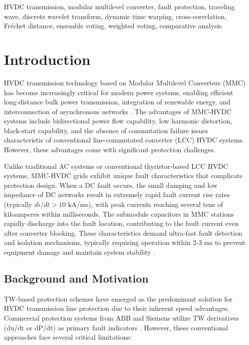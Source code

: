 \documentclass[journal]{IEEEtran}
\begin{document}
\begin{IEEEkeywords}
HVDC transmission, modular multilevel converter, fault protection, traveling wave, discrete wavelet transform, dynamic time warping, cross-correlation, Fr\'{e}chet distance, ensemble voting, weighted voting, comparative analysis.
\end{IEEEkeywords}

\section{Introduction}

 HVDC transmission technology based on Modular Multilevel Converters (MMC) has become increasingly critical for modern power systems, enabling efficient long-distance bulk power transmission, integration of renewable energy, and interconnection of asynchronous networks \cite{reference_paper_frechet, debnath2015, perez2015, flourentzou2009, vanhertem2016}. The advantages of MMC-HVDC systems include bidirectional power flow capability, low harmonic distortion, black-start capability, and the absence of commutation failure issues characteristic of conventional line-commutated converter (LCC) HVDC systems. However, these advantages come with significant protection challenges.

Unlike traditional AC systems or conventional thyristor-based LCC HVDC systems, MMC-HVDC grids exhibit unique fault characteristics that complicate protection design. When a DC fault occurs, the small damping and low impedance of DC networks result in extremely rapid fault current rise rates (typically $di/dt > 10$ kA/ms), with peak currents reaching several tens of kiloamperes within milliseconds. The submodule capacitors in MMC stations rapidly discharge into the fault location, contributing to the fault current even after converter blocking. These characteristics demand ultra-fast fault detection and isolation mechanisms, typically requiring operation within 2-3 ms to prevent equipment damage and maintain system stability \cite{reference1, reference2, sneath2016, yang2010, bucher2016}.



\subsection{Background and Motivation}

TW-based protection schemes have emerged as the predominant solution for HVDC transmission line protection due to their inherent speed advantages. Commercial protection systems from ABB and Siemens utilize TW derivatives (du/dt or dP/dt) as primary fault indicators \cite{reference3}. However, these conventional approaches face several critical limitations:
\end{document}
